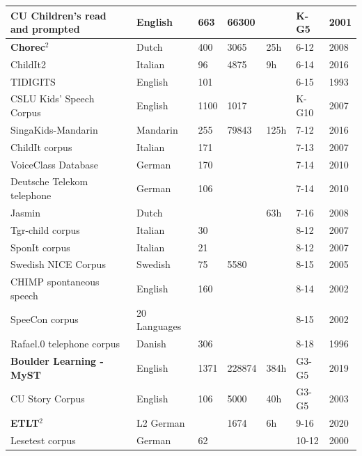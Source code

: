 \begin{table}
\begin{tabular}{|l|l|l|l|l|l|l|}
CU Children's read and prompted \cite{hagen2003children}& English & 663 & 66300 &  & K-G5 & 2001 \\ 
\hline
\textbf{Chorec$^2$} \cite{chorec} & Dutch & 400 & 3065 & 25h & 6-12 & 2008 \\ 
\hline
ChildIt2 \cite{childit2} & Italian & 96 &  4875 & 9h & 6-14 & 2016 \\ 
\hline
TIDIGITS \cite{leonard1993tidigits} & English & 101 &  &  & 6-15 & 1993 \\ 
\hline
CSLU Kids' Speech Corpus \cite{cslu} & English & 1100 & 1017 &  & K-G10 & 2007 \\ 
\hline
SingaKids-Mandarin \cite{singakids} & Mandarin & 255 & 79843 & 125h & 7-12 & 2016 \\ 
\hline
ChildIt corpus \cite{gerosa2006acoustic} & Italian & 171 &  &  & 7-13 & 2007 \\ 
\hline
VoiceClass Database \cite{burkhardt2010database} & German & 170 &  &  & 7-14 & 2010 \\ 
\hline
Deutsche Telekom telephone \cite{burkhardt2010database} & German & 106 &  &  & 7-14 & 2010 \\ 
\hline
Jasmin \cite{JASMIN} & Dutch &  &  & 63h & 7-16 & 2008 \\ 
\hline
Tgr-child corpus \cite{gerosa2006acoustic} & Italian & 30 &  &  & 8-12 & 2007 \\ 
\hline
SponIt corpus \cite{gerosa2006acoustic} & Italian & 21 &  &  & 8-12 & 2007 \\ 
\hline
Swedish NICE Corpus \cite{bell2005swedish} & Swedish & 75 & 5580 &  & 8-15 & 2005 \\
\hline
CHIMP spontaneous speech \cite{language_children2} & English & 160 &  &  & 8-14 & 2002 \\ 
\hline
SpeeCon corpus  \cite{SPEECONS} & 20 Languages &  &  &  & 8-15 & 2002 \\ 
\hline
Rafael.0 telephone corpus \cite{linguistic-children} & Danish & 306 &  &  & 8-18 & 1996 \\ 
\hline
\textbf{Boulder Learning - MyST} \cite{MyST} & English & 1371 & 228874 & 384h & G3-G5 & 2019 \\ 
\hline
CU Story Corpus \cite{hagen2003children} & English & 106 & 5000 & 40h & G3-G5 & 2003 \\ 
\hline
\textbf{ETLT$^2$} \cite{etlt} & L2 German &  & 1674 & 6h & 9-16 & 2020 \\ 
\hline
Lesetest corpus \cite{grissemann2000zurcher} & German & 62 &  &  & 10-12 & 2000 \\ 

\end{tabular}
\end{table}
